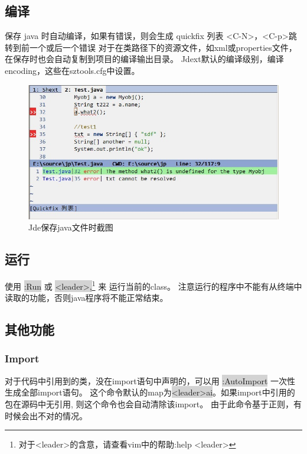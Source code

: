 \documentclass[oneside,openany]{book}
\begin{document}
\subsection{编译}
    保存 java 时自动编译，如果有错误，则会生成 quickfix 列表 <C-N>，<C-p>跳转到前一个或后一个错误 
    对于在类路径下的资源文件，如xml或properties文件，　在保存时也会自动复制到项目的编译输出目录。
    Jdext默认的编译级别，编译encoding，这些在sztools.cfg中设置。

  \begin{figure}[htbp]%
  \centering
  \includegraphics[scale=0.5]{compile.jpg}
  \caption{Jde保存java文件时截图}
  \end{figure}

\subsection{运行}
    使用 \colorbox{lightgray}{:Run} 或 \colorbox{lightgray}{<leader>,}\footnote{对于<leader>的含意，请查看vim中的帮助:help <leader>} 来 运行当前的class。
  注意运行的程序中不能有从终端中读取的功能，否则java程序将不能正常结束。

\subsection{其他功能}

\subsubsection{Import}
    对于代码中引用到的类，没在import语句中声明的，可以用 \colorbox{lightgray}{:AutoImport} 一次性生成全部import语句。 
这个命令默认的map为\colorbox{lightgray}{<leader>ai}。如果import中引用的包在源码中无引用, 则这个命令也会自动清除该import。
由于此命令基于正则，有时候会出不对的情况。
\end{document}
